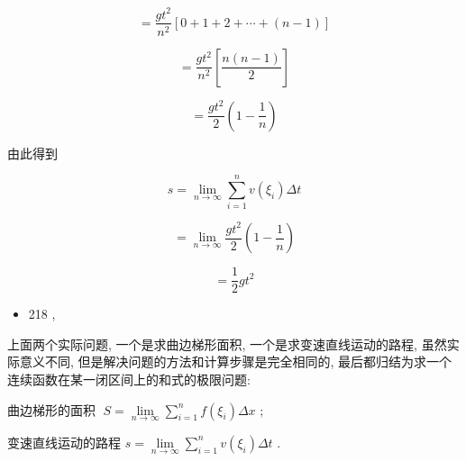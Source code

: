 \documentclass[lang=cn,newtx,10pt,scheme=chinese]{elegantbook}
\begin{document}
\[
= \frac{g{t}^{2}}{{n}^{2}}\left\lbrack {0 + 1 + 2 + \cdots + \left( {n - 1}\right) }\right\rbrack
\]

\[
= \frac{g{t}^{2}}{{n}^{2}}\left\lbrack \frac{n\left( {n - 1}\right) }{2}\right\rbrack
\]

\[
= \frac{g{t}^{2}}{2}\left( {1 - \frac{1}{n}}\right)
\]

由此得到

\[
s = \mathop{\lim }\limits_{{n \rightarrow \infty }}\mathop{\sum }\limits_{{i = 1}}^{n}v\left( {\xi }_{i}\right) {\Delta t}
\]

\[
= \mathop{\lim }\limits_{{n \rightarrow \infty }}\frac{g{t}^{2}}{2}\left( {1 - \frac{1}{n}}\right)
\]

\[
= \frac{1}{2}g{t}^{2}
\]

\begin{itemize}
\item 218 ,
\end{itemize}

上面两个实际问题, 一个是求曲边梯形面积, 一个是求变速直线运动的路程, 虽然实际意义不同, 但是解决问题的方法和计算步骤是完全相同的, 最后都归结为求一个连续函数在某一闭区间上的和式的极限问题:

曲边梯形的面积 \(\;S = \mathop{\lim }\limits_{{n \rightarrow \infty }}\mathop{\sum }\limits_{{i = 1}}^{n}f\left( {\xi }_{i}\right) {\Delta x}\) ;

变速直线运动的路程 \(s = \mathop{\lim }\limits_{{n \rightarrow \infty }}\mathop{\sum }\limits_{{i = 1}}^{n}v\left( {\xi }_{i}\right) {\Delta t}\) .
\end{document}
